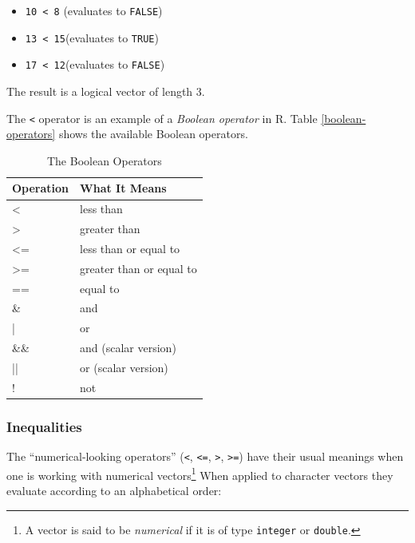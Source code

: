 \documentclass[]{book}
\providecommand{\tightlist}{%
  \setlength{\itemsep}{0pt}\setlength{\parskip}{0pt}}
\let\rmarkdownfootnote\footnote%
\def\footnote{\protect\rmarkdownfootnote}
\theoremstyle{definition}
\theoremstyle{definition}
\theoremstyle{definition}
\theoremstyle{remark}
\begin{document}
\begin{itemize}
\tightlist
\item
  \texttt{10\ \textless{}\ 8} (evaluates to \texttt{FALSE})
\item
  \texttt{13\ \textless{}\ 15}(evaluates to \texttt{TRUE})
\item
  \texttt{17\ \textless{}\ 12}(evaluates to \texttt{FALSE})
\end{itemize}

The result is a logical vector of length 3.

The \texttt{\textless{}} operator is an example of a \emph{Boolean
operator} in R. Table \ref{boolean-operators} shows the available
Boolean operators. 
 
 

\begin{table}

\caption{\label{tab:unnamed-chunk-101}The Boolean Operators}
\centering
\begin{tabular}[t]{l|l}
\hline
Operation & What It Means\\
\hline
< & less than\\
\hline
> & greater than\\
\hline
<= & less than or equal to\\
\hline
>= & greater than or equal to\\
\hline
== & equal to\\
\hline
\& & and\\
\hline
| & or\\
\hline
\&\& & and (scalar version)\\
\hline
|| & or (scalar version)\\
\hline
! & not\\
\hline
\end{tabular}
\end{table}

\subsubsection{Inequalities}\label{inequalities}

The ``numerical-looking operators'' (\texttt{\textless{}},
\texttt{\textless{}=}, \texttt{\textgreater{}},
\texttt{\textgreater{}=}) have their usual meanings when one is working
with numerical vectors\footnote{A vector is said to be \emph{numerical}
  if it is of type \texttt{integer} or \texttt{double}.} When applied to
character vectors they evaluate according to an alphabetical order:
\end{document}
